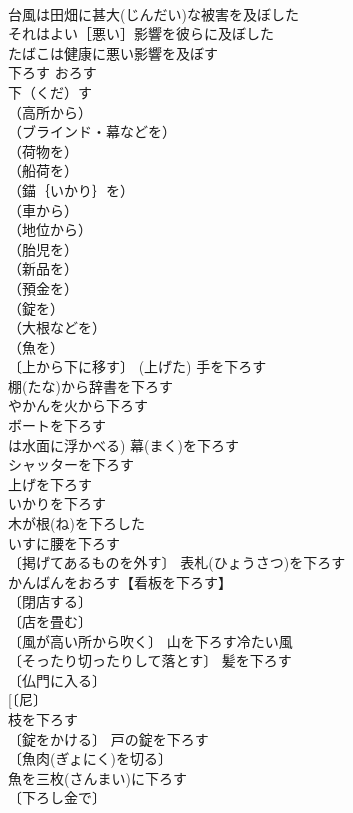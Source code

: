 \documentclass[8pt]{extreport}
\begin{document}
\begin{CJK}{UTF8}{min}
\\	台風は田畑に甚大(じんだい)な被害を及ぼした 
\\	それはよい［悪い］影響を彼らに及ぼした 
\\	たばこは健康に悪い影響を及ぼす 
\\	下ろす	おろす	
\\	下（くだ）す 
\\	（高所から）
\\	（ブラインド・幕などを）
\\	（荷物を）
\\	（船荷を）
\\	（錨｛いかり｝を）
\\	（車から）
\\	（地位から）
\\	（胎児を）
\\	（新品を）
\\	（預金を）
\\	（錠を）
\\	（大根などを）
\\	（魚を）
\\	〔上から下に移す〕 (上げた) 手を下ろす 
\\	棚(たな)から辞書を下ろす 
\\	やかんを火から下ろす 
\\	ボートを下ろす 
\\	は水面に浮かべる) 幕(まく)を下ろす 
\\	シャッターを下ろす 
\\	上げを下ろす 
\\	いかりを下ろす 
\\	木が根(ね)を下ろした 
\\	いすに腰を下ろす 
\\	〔掲げてあるものを外す〕 表札(ひょうさつ)を下ろす 
\\	かんばんをおろす【看板を下ろす】 
\\	〔閉店する〕
\\	〔店を畳む〕
\\	〔風が高い所から吹く〕 山を下ろす冷たい風 
\\	〔そったり切ったりして落とす〕 髪を下ろす 
\\	〔仏門に入る〕
\\	[〔尼〕
\\	枝を下ろす 
\\	〔錠をかける〕 戸の錠を下ろす 
\\	〔魚肉(ぎょにく)を切る〕 
\\	魚を三枚(さんまい)に下ろす 
\\	〔下ろし金で〕

\end{CJK}
\end{document}
